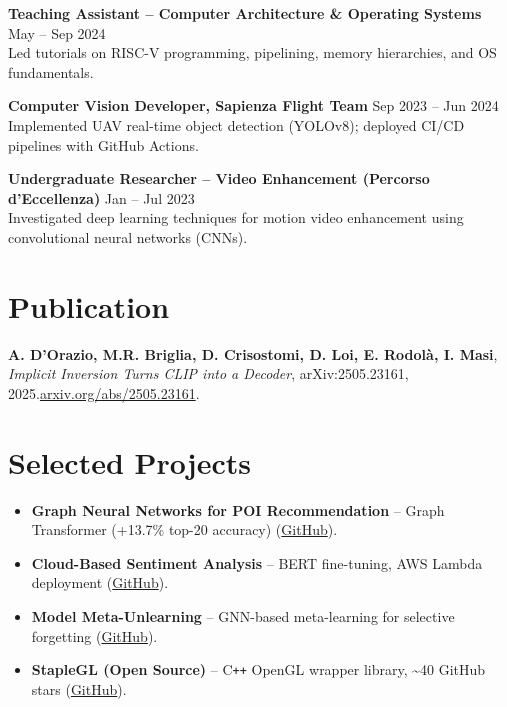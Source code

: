 \documentclass[a4paper,10pt]{article}
\begin{document}
\noindent
\textbf{Teaching Assistant -- Computer Architecture \& Operating Systems} \hfill May -- Sep 2024 \\
Led tutorials on RISC-V programming, pipelining, memory hierarchies, and OS fundamentals.

\noindent
\textbf{Computer Vision Developer, Sapienza Flight Team} \hfill Sep 2023 -- Jun 2024 \\
Implemented UAV real-time object detection (YOLOv8); deployed CI/CD pipelines with GitHub Actions.

\noindent
\textbf{Undergraduate Researcher -- Video Enhancement (Percorso d'Eccellenza)} \hfill Jan -- Jul 2023 \\
Investigated deep learning techniques for motion video enhancement using convolutional neural networks (CNNs).
\section*{Publication}
\noindent
\textbf{A. D'Orazio, M.R. Briglia, D. Crisostomi, D. Loi, E. Rodolà, I. Masi},  
\emph{Implicit Inversion Turns CLIP into a Decoder}, arXiv:2505.23161, 2025.\@ \href{https://arxiv.org/abs/2505.23161}{arxiv.org/abs/2505.23161}.

\section*{Selected Projects}
\begin{itemize}
    \item \textbf{Graph Neural Networks for POI Recommendation} -- Graph Transformer (+13.7\% top-20 accuracy) (\href{https://github.com/dario-loi/foursquare}{GitHub}).
    \item \textbf{Cloud-Based Sentiment Analysis} -- BERT fine-tuning, AWS Lambda deployment (\href{https://github.com/dario-loi/cloud_computing_2025}{GitHub}).
    \item \textbf{Model Meta-Unlearning} -- GNN-based meta-learning for selective forgetting (\href{https://github.com/dario-loi/unlearning}{GitHub}).
    \item \textbf{StapleGL (Open Source)} -- C\texttt{++} OpenGL wrapper library, \textasciitilde40 GitHub stars (\href{https://github.com/dario-loi/staplegl}{GitHub}).
\end{itemize}

\end{document}
